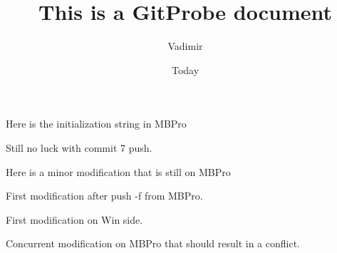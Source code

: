 \documentclass[]{article}
\begin{document}
\title{This is a GitProbe document}
\author{Vadimir}
\date{Today}
\maketitle

Here is the initialization string in MBPro

Still no luck with commit 7 push.

Here is a minor modification that is still on MBPro

First modification after push -f  from MBPro.

First modification on Win side. 

Concurrent modification on MBPro that should result in a conflict.
\end{document}

